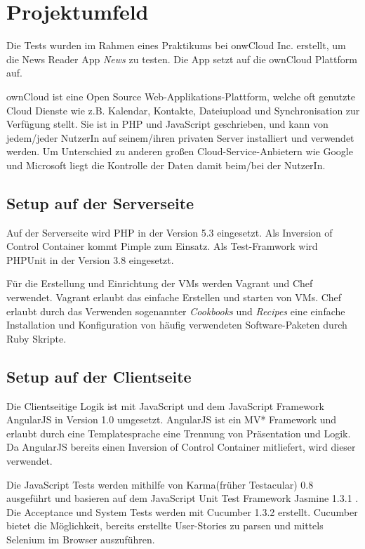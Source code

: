 \documentclass[a4paper,bibtotoc,oneside]{scrbook}
\begin{document}
\chapter{Projektumfeld}
Die Tests wurden im Rahmen eines Praktikums bei onwCloud Inc. erstellt, um die News Reader App \emph{News} zu testen. Die App setzt auf die ownCloud\cite{owncloud} Plattform auf.

ownCloud ist eine Open Source Web-Applikations-Plattform, welche oft genutzte Cloud Dienste wie z.B. Kalendar, Kontakte, Dateiupload und Synchronisation zur Verfügung stellt. Sie ist in PHP und JavaScript geschrieben, und kann von jedem/jeder NutzerIn auf seinem/ihren privaten Server installiert und verwendet werden. Um Unterschied zu anderen großen Cloud-Service-Anbietern wie Google und Microsoft liegt die Kontrolle der Daten damit beim/bei der NutzerIn. 

\section{Setup auf der Serverseite}
Auf der Serverseite wird PHP in der Version 5.3 eingesetzt. Als Inversion of Control Container kommt Pimple\cite{pimple} zum Einsatz. Als Test-Framwork wird PHPUnit\cite{phpunit} in der Version 3.8 eingesetzt.

Für die Erstellung und Einrichtung der VMs werden Vagrant\cite{vagrant} und Chef\cite{chef} verwendet. Vagrant erlaubt das einfache Erstellen und starten von VMs. Chef erlaubt durch das Verwenden sogenannter \emph{Cookbooks} und \emph{Recipes} eine einfache Installation und Konfiguration von häufig verwendeten Software-Paketen durch Ruby Skripte.

\section{Setup auf der Clientseite}
Die Clientseitige Logik ist mit JavaScript und dem JavaScript Framework AngularJS\cite{angular} in Version 1.0 umgesetzt. AngularJS ist ein MV* Framework und erlaubt durch eine Templatesprache eine Trennung von Präsentation und Logik. Da AngularJS bereits einen Inversion of Control Container mitliefert, wird dieser verwendet. 

Die JavaScript Tests werden mithilfe von Karma\cite{karma}(früher Testacular) 0.8 ausgeführt und basieren auf dem JavaScript Unit Test Framework Jasmine 1.3.1 \cite{jasmine}. Die Acceptance und System Tests werden mit Cucumber 1.3.2 \cite{cucumber} erstellt. Cucumber bietet die Möglichkeit, bereits erstellte User-Stories zu parsen und mittels Selenium im Browser auszuführen.
\end{document}
